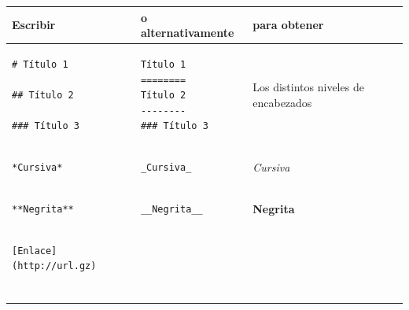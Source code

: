 \documentclass[
]{book}
\newcounter{none} %
\theoremstyle{break}
\theoremstyle{nonumberplain}
\begin{document}
{\def\LTcaptype{none} %
\begin{longtable}[]{@{}
  >{\raggedright\arraybackslash}p{}
  >{\raggedright\arraybackslash}p{}
  >{\raggedright\arraybackslash}p{}@{}}
\toprule\noalign{}
\begin{minipage}[b]{\linewidth}\raggedright
Escribir
\end{minipage} & \begin{minipage}[b]{\linewidth}\raggedright
o alternativamente
\end{minipage} & \begin{minipage}[b]{\linewidth}\raggedright
para obtener
\end{minipage} \\
\midrule\noalign{}
\endhead
\bottomrule\noalign{}
\endlastfoot
\begin{minipage}[t]{\linewidth}\raggedright
\begin{verbatim}
# Título 1

## Título 2

### Título 3
\end{verbatim}
\end{minipage} & \begin{minipage}[t]{\linewidth}\raggedright
\begin{verbatim}
Título 1
========
Título 2
--------
### Título 3
\end{verbatim}
\end{minipage} & Los distintos
niveles de encabezados \\
\begin{minipage}[t]{\linewidth}\raggedright
\begin{verbatim}
*Cursiva*
\end{verbatim}
\end{minipage} & \begin{minipage}[t]{\linewidth}\raggedright
\begin{verbatim}
_Cursiva_
\end{verbatim}
\end{minipage} & \emph{Cursiva} \\
\begin{minipage}[t]{\linewidth}\raggedright
\begin{verbatim}
**Negrita**
\end{verbatim}
\end{minipage} & \begin{minipage}[t]{\linewidth}\raggedright
\begin{verbatim}
__Negrita__
\end{verbatim}
\end{minipage} & \textbf{Negrita} \\
\begin{minipage}[t]{\linewidth}\raggedright
\begin{verbatim}
[Enlace](http://url.gz)


\end{verbatim}
\end{minipage}
\end{longtable}}
\end{document}
